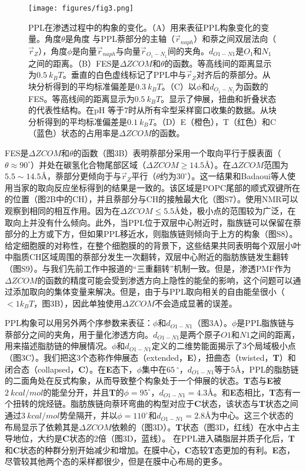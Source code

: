 \documentclass[journal=,manuscript=artical,email=false]{achemso}
\begin{document}
\begin{figure}[h]
\centering
\texttt{[image: figures/fig3.png]}
\caption{PPL在渗透过程中的构象的变化。（A）用来表征PPL构象变化的变量。角度$\theta$是角度
与PPL萘部分的主轴（$\vec{r}_{naph}$）和萘之间双层法向（$\vec{r}_Z$），角度$\phi$是向量$\vec{r}_{naph}$与向量$\vec{r}_{O_1-N_1}$间的夹角。$d_{O1-N1}$是$O_1$和$N_1$之间的距离。（B）FES是$\Delta ZCOM$和$\theta$的函数。等高线间的距离显示为$0.5~k_BT$。垂直的白色虚线标记了PPL中与$\vec{r}_Z$对齐后的萘部分。从块分析得到的平均标准偏差是$0.3~k_BT$。（C）以$\phi$和$d_{O_1-N_1}$为函数的FES。等高线间的距离显示为$0.5~k_BT$。显示了伸展，扭曲和折叠状态的代表性结构。在pH 等于$7$时从所有伞型采样窗口收集的数据。从块分析得到的平均标准偏差是$0.1~k_BT$。（D）E（橙色），T（红色）和C（蓝色）状态的占用率是$\Delta ZCOM$的函数。 }
\label{fig:fig3}
\end{figure}

FES是$\Delta ZCOM$和$\theta$的函数（图3B）表明萘部分采用一个取向平行于膜表面（$\theta \approx 90 ^{\circ}$）并处在碳氢化合物尾部区域（$\Delta ZCOM \ge 14.5$\AA ）。在$\Delta ZCOM$范围为$5.5\sim 14.5$\AA，萘部分更倾向于与$\vec{r}_Z$平行（$\theta$约为$30^{\circ}$）。这一结果和Badaoui等人使用当家的取向反应坐标得到的结果是一致的。该区域是POPC尾部的顺式双键所在的位置（图2B中的CH），并且萘部分与CH的接触最大化（图S7）。使用NMR可以观察到相同的相互作用。因为在$\Delta ZCOM \le 5.5$\AA 处，极小点的范围较为广泛，在取向上并没有什么倾向。此外，当PPL位于双层中心附近时，脂族链可以保留在萘部分的上方或下方，但如果PPL移近水，则脂族链则倾向于上方的构象（图S8）。给定细胞膜的对称性，在整个细胞膜的的背景下，这些结果共同表明每个双层小叶中脂质CH区域周围的萘部分发生一次翻转，双层中心附近的脂肪族链发生翻转（图S9）。与我们先前工作中报道的“三重翻转”机制一致。但是，渗透PMF作为$\Delta ZCOM$的函数的精度可能会受到渗透方向上隐性的能垒的影响，这个问题可以通过添加取向的集体变量来解决。但是，由于与PPL取向相关的自由能垒很小（$ < 1 k_BT$，图3B），因此单独使用$\Delta ZCOM$不会造成显著的误差。

PPL构象可以用另外两个序参数来表征：$\phi$和$d_{O1-N1}$（图3A）。$\phi$是PPL脂族链与萘部分之间的夹角，用于量化渗透方向。$d_{O1-N1}$是两个原子$O1$和$N1$之间的距离，用来描述脂肪链的伸展情况。$\phi$和$d_{O1-N1}$定义的二维势能面揭示了3个局域极小点（图3C）。我们把这3个态称作伸展态（extended，\textbf{E}），扭曲态（twisted，\textbf{T}）和闭合态（collapsed，\textbf{C}）。在\textbf{E}态下，$\phi$集中在$65~^{\circ}$，$d_{O1-N1}$等于$5$\AA，PPL的脂肪链的二面角处在反式构象，从而导致整个构象处于一个伸展的状态。\textbf{T}态与\textbf{E}被$2~kcal/mol$的能垒分开，并且\textbf{T}的$\phi = 95 ^{\circ}$，$d_{O1-N1}=4.3$\AA。和\textbf{E}态相比，\textbf{T}态有一个扭转的烷烃链。脂肪族链向萘环弯曲的构型对应于\textbf{C}状态，该状态与\textbf{T}状态之间通过$3~kcal / mol$势垒隔开，并以$\phi = 110 ^{\circ}$和$d_{O1-N1}= 2.8$\AA 为中心。这三个状态的布局显示了依赖其是$\Delta ZCOM$依赖的（图3D）。\textbf{T}状态（图3D，红线）在水中占主导地位，大约是\textbf{C}状态的$2$倍（图3D，蓝线）。
在PPL进入磷脂层并质子化后，\textbf{T}和\textbf{C}状态的种群分别开始减少和增加。在膜中心，\textbf{C}态较\textbf{T}态更加的有利。\textbf{E}态，尽管较其他两个态的采样都很少，但是在膜中心布局的更多。
\end{document}
